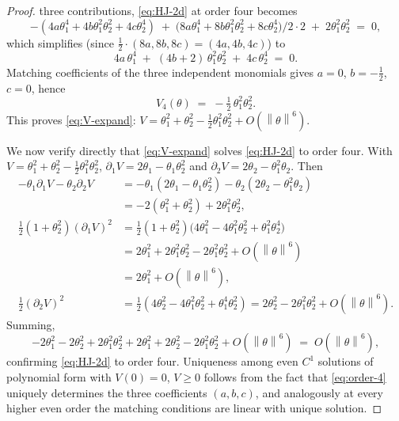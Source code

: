 \documentclass[11pt,a4paper]{article}
\theoremstyle{definition}
\theoremstyle{remark}
\newcommand{\norm}[1]{\left\|#1\right\|}
\begin{document}
\begin{proof}
   three contributions, \eqref{eq:HJ-2d} at order four becomes
   \[
      -(4a\theta_1^4 + 4b\theta_1^2\theta_2^2 + 4c\theta_2^4)
      \;+\; \bigl(8a\theta_1^4 + 8b\theta_1^2\theta_2^2 + 8c\theta_2^4\bigr)/2\cdot 2
      \;+\; 2\theta_1^2\theta_2^2 \;=\; 0,
   \]
   which simplifies (since $\tfrac{1}{2}\cdot(8a,8b,8c) = (4a,4b,4c)$) to
   \begin{equation}\label{eq:order-4}
      4a\,\theta_1^4 \;+\; (4b+2)\,\theta_1^2\theta_2^2
                                       \;+\; 4c\,\theta_2^4 \;=\; 0.
   \end{equation}
   Matching coefficients of the three independent monomials gives
   $a = 0$, $b = -\tfrac{1}{2}$, $c = 0$, hence
   \[
      V_4(\theta) \;=\; -\tfrac{1}{2}\,\theta_1^2\theta_2^2.
   \]
   This proves \eqref{eq:V-expand}: $V = \theta_1^2 + \theta_2^2
   - \tfrac{1}{2}\theta_1^2\theta_2^2 + O(\norm\theta^6)$.

   We now verify directly that \eqref{eq:V-expand} solves
   \eqref{eq:HJ-2d} to order four.  With $V = \theta_1^2 + \theta_2^2
   - \tfrac{1}{2}\theta_1^2\theta_2^2$, $\partial_1 V = 2\theta_1
   - \theta_1\theta_2^2$ and $\partial_2 V = 2\theta_2 -
   \theta_1^2\theta_2$.  Then
   \begin{align*}
      -\theta_1\partial_1 V - \theta_2\partial_2 V
      &= -\theta_1(2\theta_1 - \theta_1\theta_2^2)
                  -\theta_2(2\theta_2 - \theta_1^2\theta_2)\\
      &= -2(\theta_1^2+\theta_2^2) + 2\theta_1^2\theta_2^2,\\
      \tfrac{1}{2}(1+\theta_2^2)(\partial_1 V)^2
      &= \tfrac{1}{2}(1+\theta_2^2)\bigl(4\theta_1^2
                              - 4\theta_1^2\theta_2^2
                              + \theta_1^2\theta_2^4\bigr)\\
      &= 2\theta_1^2 + 2\theta_1^2\theta_2^2 - 2\theta_1^2\theta_2^2
                                            + O(\norm\theta^6)\\
      &= 2\theta_1^2 + O(\norm\theta^6),\\
      \tfrac{1}{2}(\partial_2 V)^2
      &= \tfrac{1}{2}(4\theta_2^2 - 4\theta_1^2\theta_2^2
                                  + \theta_1^4\theta_2^2)
       = 2\theta_2^2 - 2\theta_1^2\theta_2^2 + O(\norm\theta^6).
   \end{align*}
   Summing,
   \[
      -2\theta_1^2 - 2\theta_2^2 + 2\theta_1^2\theta_2^2
      + 2\theta_1^2 + 2\theta_2^2 - 2\theta_1^2\theta_2^2
      + O(\norm\theta^6) \;=\; O(\norm\theta^6),
   \]
   confirming \eqref{eq:HJ-2d} to order four.  Uniqueness among even
   $C^1$ solutions of polynomial form with $V(0)=0$, $V\geq 0$ follows
   from the fact that \eqref{eq:order-4} uniquely determines the three
   coefficients $(a,b,c)$, and analogously at every higher even order
   the matching conditions are linear with unique solution.


\end{proof}
\end{document}
